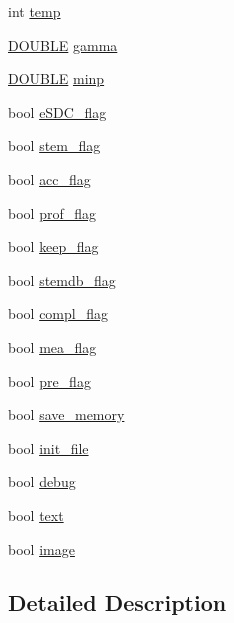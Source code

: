 \begin{DoxyCompactItemize}
\item 
int \hyperlink{class_rfold_1_1_arg_a25e15defa3a3a80e6a0593989ea9e44a}{temp}
\item 
\hyperlink{energy__const_8hh_a8747af38b86aa2bbcda2f1b1aa0888c2}{D\+O\+U\+B\+L\+E} \hyperlink{class_rfold_1_1_arg_a54717ae319eecf4154dba39e42094b60}{gamma}
\item 
\hyperlink{energy__const_8hh_a8747af38b86aa2bbcda2f1b1aa0888c2}{D\+O\+U\+B\+L\+E} \hyperlink{class_rfold_1_1_arg_a4ea3681597506bb5d8b10e2cda9a3ca6}{minp}
\item 
bool \hyperlink{class_rfold_1_1_arg_addf5237deb4bf9025fa747fbd2c33366}{e\+S\+D\+C\+\_\+flag}
\item 
bool \hyperlink{class_rfold_1_1_arg_aa67a67820097b91b6376581ae28ee481}{stem\+\_\+flag}
\item 
bool \hyperlink{class_rfold_1_1_arg_aaffa31cee9aee99818d1629270d2516a}{acc\+\_\+flag}
\item 
bool \hyperlink{class_rfold_1_1_arg_ada0e4aafdcedc01f9891d523f2626226}{prof\+\_\+flag}
\item 
bool \hyperlink{class_rfold_1_1_arg_ab606ce2fd660a90d7af0f1d5773ffd57}{keep\+\_\+flag}
\item 
bool \hyperlink{class_rfold_1_1_arg_ad5d34ff788f8795f1e75f313dd67c79e}{stemdb\+\_\+flag}
\item 
bool \hyperlink{class_rfold_1_1_arg_a14c91eff857985c1c3eeac20dac4d092}{compl\+\_\+flag}
\item 
bool \hyperlink{class_rfold_1_1_arg_a7b3d1a355bec84586c9832c1858a2f6b}{mea\+\_\+flag}
\item 
bool \hyperlink{class_rfold_1_1_arg_a8a7ca4df7e6085e8cc4af60917c99a92}{pre\+\_\+flag}
\item 
bool \hyperlink{class_rfold_1_1_arg_a4baebf9ebff2c466c56e5e377cccd360}{save\+\_\+memory}
\item 
bool \hyperlink{class_rfold_1_1_arg_a2cb4e22a01c0d933cc18dc2f48a05649}{init\+\_\+file}
\item 
bool \hyperlink{class_rfold_1_1_arg_ad6f2d65fd94879a530699ee4680e5d63}{debug}
\item 
bool \hyperlink{class_rfold_1_1_arg_ad174f7be713784b338a8e3423c950dac}{text}
\item 
bool \hyperlink{class_rfold_1_1_arg_ab7df3ff6900da414d534707f37d87c2d}{image}
\end{DoxyCompactItemize}


\subsection{Detailed Description}



